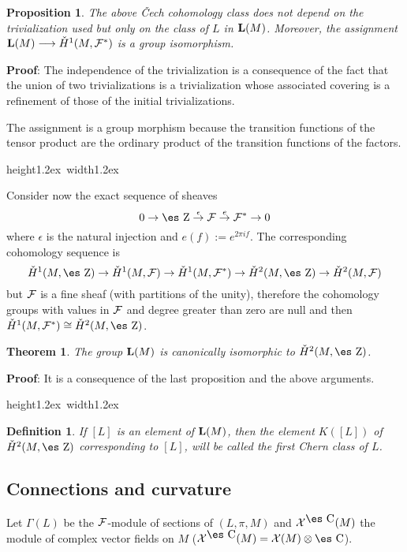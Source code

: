\documentclass[12pt]{article}
\theoremstyle{plain}
\newtheorem{teor}{Theorem}
\newtheorem{prop}{Proposition}
\newtheorem{definition}{Definition}
\def\map#1{\mathrel{\mathop{\to}\limits^{#1}}}
\def\qed{\ifvmode\removelastskip\fi
{\unskip\nobreak\hfil\penalty50\hbox{}\nobreak\hfil
\hbox{\vrule height1.2ex width1.2ex}\parfillskip=0pt
\finalhyphendemerits=0 \par\smallskip}}
\def\Zahl{\mbox{\es Z}}
\def\Complex{\mbox{\es C}}
\begin{document}
\begin{prop}
The above \v{C}ech cohomology class
does not depend on the trivialization used
but only on the class of $L$ in ${\bf L}(M)$. Moreover, the assignment
${\bf L}(M) \longrightarrow \check{H}^1 (M,{\cal F}^*)$
is a group isomorphism.
\label{indep}
\end{prop}
{\bf Proof}: 
The independence of the trivialization
is a consequence of the fact that
the union of two trivializations is
a trivialization whose associated covering is
a refinement of those of the initial trivializations.

The assignment is a group morphism because
the transition functions of the tensor product
are the ordinary product of the transition functions
of the factors.
\qed

Consider now the exact sequence of sheaves
$$
0 \to \Zahl \map{\epsilon} {\cal F} \map{e} {\cal F}^* \to 0
$$
where $\epsilon$ is the natural injection and
$e(f):=e^{2\pi if}$.
The corresponding cohomology sequence is
$$
\check{H}^1(M,\Zahl ) \to
\check{H}^1(M,{\cal F}) \to
\check{H}^1(M,{\cal F}^*) \to
\check{H}^2(M,\Zahl) \to
\check{H}^2(M,{\cal F})
$$
but ${\cal F}$ is a fine sheaf
(with partitions of the unity),
therefore the cohomology groups with values in
${\cal F}$ and degree greater than zero are null and then
$\check{H}^1(M,{\cal F}^*) \cong  \check{H}^2(M,\Zahl)$.

\begin{teor}
The group ${\bf L}(M)$ is canonically isomorphic to $
\check{H}^2(M,\Zahl )$.
\label{cais}
\end{teor}
{\bf Proof}: 
It is a consequence of the last proposition and the above arguments.
\qed

\begin{definition}
If $[L]$ is an element of  ${\bf L}(M)$,
then the element $K([L])$ of $\check{H}^2(M,\Zahl)$
corresponding to $[L]$, will be called the
{\rm first Chern class} of $L$.
\label{chern}
\end{definition}


\subsection{Connections and curvature}


Let $\Gamma (L)$ be the ${\cal F}$-module of sections
of $(L,\pi ,M)$ and ${\cal X}^{\Complex}(M)$
the module of complex vector fields on $M$
(${\cal X}^{\Complex}(M) = {\cal X}(M) \otimes \Complex$).
\end{document}
